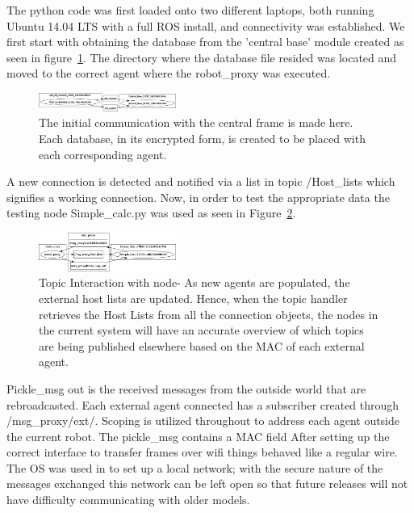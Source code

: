 \documentclass[conference]{IEEEtran}
\begin{document}
The python code was first loaded onto two different laptops, both running Ubuntu 14.04 LTS with a full ROS install, and connectivity was established. We first start with obtaining the database from the 'central base' module created as seen in figure~\ref{fig:TopicIntr1}. The directory where the database file resided was located and moved to the correct agent where the robot\_proxy was executed.

\begin{figure}[]
\centering
\includegraphics[width=0.4\textwidth]{TopicIntr1}
\caption{The initial communication with the central frame is made here. Each database, in its encrypted form, is created to be placed with each corresponding agent.}
\label{fig:TopicIntr1}
\end{figure}

A new connection is detected and notified via a list in topic /Host\_lists which signifies a working connection. Now, in order to test the appropriate data the testing node Simple\_calc.py was used as seen in Figure~\ref{fig:TopicIntr2}.

\begin{figure}[]
\centering
\includegraphics[width=0.4\textwidth]{TopicIntr2}
\caption{Topic Interaction with node- As new agents are populated, the external host lists are updated. Hence, when the topic handler retrieves the Host Lists from all the connection objects, the nodes in the current system will have an accurate overview of which topics are being published elsewhere based on the MAC of each external agent.}
\label{fig:TopicIntr2}
\end{figure}

Pickle\_msg out is the received messages from the outside world that are rebroadcasted. Each external agent connected has a subscriber created through /msg\_proxy/ext/. Scoping is utilized throughout to address each agent outside the current robot. The pickle\_msg contains a MAC field After setting up the correct interface to transfer frames over wifi things behaved like a regular wire. The OS was used in to set up a local network; with the secure nature of the messages exchanged this network can be left open so that future releases will not have difficulty communicating with older models. 
\end{document}
